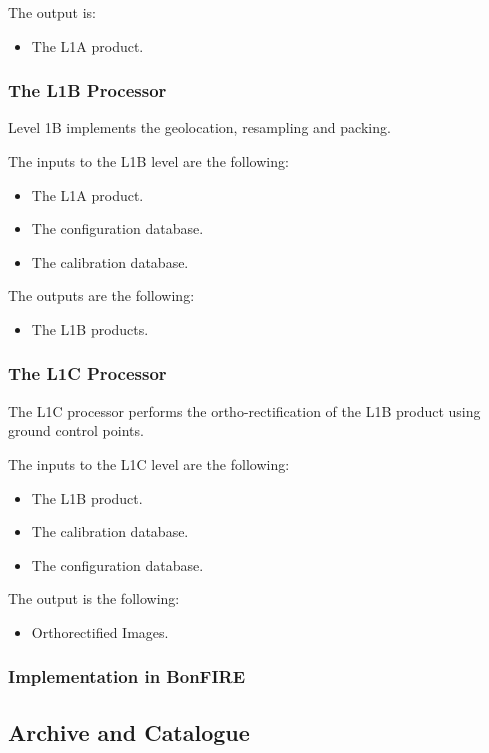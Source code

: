 \begin{enumerate}
The output is:
\begin{itemize}
\item The L1A product.
\end{itemize}

\subsubsection{The L1B Processor}
Level 1B implements the geolocation, resampling and packing.

The inputs to the L1B level are the following:
\begin{itemize}
\item The L1A product.
\item The configuration database.
\item The calibration database.
\end{itemize}

The outputs are the following:
\begin{itemize}
\item The L1B products.
\end{itemize}


\subsubsection{The L1C Processor}

The L1C processor performs the ortho-rectification of the L1B product using ground control points.

The inputs to the L1C level are the following:
\begin{itemize}
\item The L1B  product.
\item The calibration database.
\item The configuration database.
\end{itemize}

The output is the following:
\begin{itemize}
\item Orthorectified Images.
\end{itemize}

\subsubsection{Implementation in BonFIRE}




\subsection{Archive and Catalogue}



\end{enumerate}
